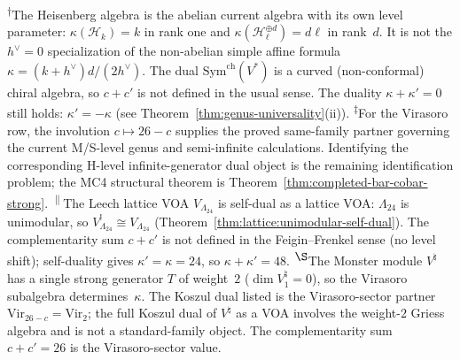 \smallskip
\noindent\textsuperscript{$\dagger$}The Heisenberg algebra is the
abelian current algebra with its own level parameter:
$\kappa(\mathcal H_k)=k$ in rank one and
$\kappa(\mathcal H_{\ell}^{\oplus d})=d\ell$ in rank~$d$.
It is not the $h^\vee=0$ specialization of the non-abelian simple
affine formula $\kappa=(k+h^\vee)d/(2h^\vee)$.
The dual $\mathrm{Sym}^{\mathrm{ch}}(V^*)$ is a curved (non-conformal) chiral algebra,
so $c + c'$ is not defined in the usual sense.
The duality $\kappa + \kappa' = 0$ still holds: $\kappa' = -\kappa$
(see Theorem~\ref{thm:genus-universality}(ii)).
\textsuperscript{$\ddagger$}For the Virasoro row, the involution
$c \mapsto 26-c$ supplies the proved same-family partner governing the
current M/S-level genus and semi-infinite calculations. Identifying the
corresponding H-level infinite-generator dual object is the remaining
identification problem; the MC4 structural theorem is
Theorem~\ref{thm:completed-bar-cobar-strong}.
\textsuperscript{$\|$}The Leech lattice VOA $V_{\Lambda_{24}}$ is self-dual
as a lattice VOA: $\Lambda_{24}$ is unimodular, so
$V_{\Lambda_{24}}^! \cong V_{\Lambda_{24}}$
(Theorem~\ref{thm:lattice:unimodular-self-dual}).
The complementarity sum $c + c'$ is not defined in the
Feigin--Frenkel sense (no level shift); self-duality gives
$\kappa' = \kappa = 24$, so $\kappa + \kappa' = 48$.
\textsuperscript{$\S$}The Monster module $V^\natural$ has a single strong
generator $T$ of weight~$2$ ($\dim V_1^\natural = 0$), so the Virasoro
subalgebra determines~$\kappa$. The Koszul dual listed is the Virasoro-sector
partner $\mathrm{Vir}_{26-c} = \mathrm{Vir}_2$;
the full Koszul dual of $V^\natural$ as a VOA involves the
weight-$2$ Griess algebra and is not a standard-family object.
The complementarity sum $c + c' = 26$ is the Virasoro-sector value.


